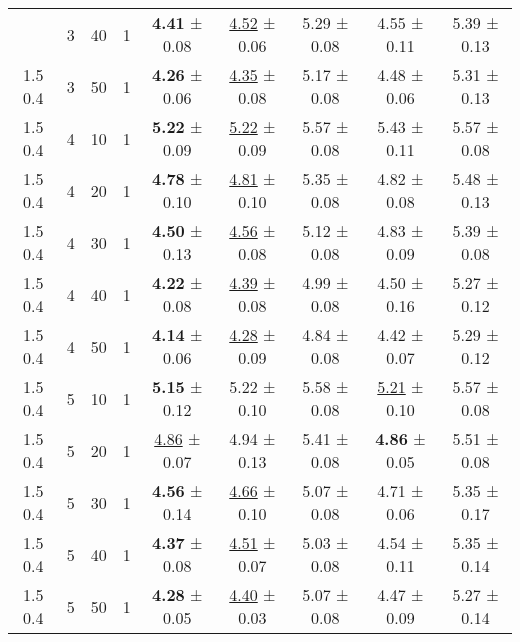\begin{tabular}{ccccccccc}
\begin{tabular}{lllllllll}
1.5 0.4 & 3 & 40 & 1 &    \textbf{4.41} ± 0.08 & \underline{4.52} ± 0.06 & 5.29 ± 0.08 &             4.55 ± 0.11 & 5.39 ± 0.13 \\
1.5 0.4 & 3 & 50 & 1 &    \textbf{4.26} ± 0.06 & \underline{4.35} ± 0.08 & 5.17 ± 0.08 &             4.48 ± 0.06 & 5.31 ± 0.13 \\
1.5 0.4 & 4 & 10 & 1 &    \textbf{5.22} ± 0.09 & \underline{5.22} ± 0.09 & 5.57 ± 0.08 &             5.43 ± 0.11 & 5.57 ± 0.08 \\
1.5 0.4 & 4 & 20 & 1 &    \textbf{4.78} ± 0.10 & \underline{4.81} ± 0.10 & 5.35 ± 0.08 &             4.82 ± 0.08 & 5.48 ± 0.13 \\
1.5 0.4 & 4 & 30 & 1 &    \textbf{4.50} ± 0.13 & \underline{4.56} ± 0.08 & 5.12 ± 0.08 &             4.83 ± 0.09 & 5.39 ± 0.08 \\
1.5 0.4 & 4 & 40 & 1 &    \textbf{4.22} ± 0.08 & \underline{4.39} ± 0.08 & 4.99 ± 0.08 &             4.50 ± 0.16 & 5.27 ± 0.12 \\
1.5 0.4 & 4 & 50 & 1 &    \textbf{4.14} ± 0.06 & \underline{4.28} ± 0.09 & 4.84 ± 0.08 &             4.42 ± 0.07 & 5.29 ± 0.12 \\
1.5 0.4 & 5 & 10 & 1 &    \textbf{5.15} ± 0.12 &             5.22 ± 0.10 & 5.58 ± 0.08 & \underline{5.21} ± 0.10 & 5.57 ± 0.08 \\
1.5 0.4 & 5 & 20 & 1 & \underline{4.86} ± 0.07 &             4.94 ± 0.13 & 5.41 ± 0.08 &    \textbf{4.86} ± 0.05 & 5.51 ± 0.08 \\
1.5 0.4 & 5 & 30 & 1 &    \textbf{4.56} ± 0.14 & \underline{4.66} ± 0.10 & 5.07 ± 0.08 &             4.71 ± 0.06 & 5.35 ± 0.17 \\
1.5 0.4 & 5 & 40 & 1 &    \textbf{4.37} ± 0.08 & \underline{4.51} ± 0.07 & 5.03 ± 0.08 &             4.54 ± 0.11 & 5.35 ± 0.14 \\
1.5 0.4 & 5 & 50 & 1 &    \textbf{4.28} ± 0.05 & \underline{4.40} ± 0.03 & 5.07 ± 0.08 &             4.47 ± 0.09 & 5.27 ± 0.14 \\
\bottomrule
\end{tabular}
